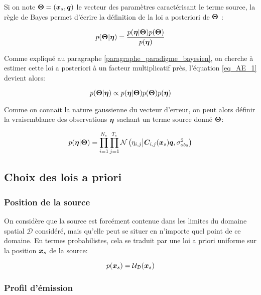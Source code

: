 Si on note ${\bm{\Theta}} = ({\bm{x}_s}, {\bm{q}})$ le vecteur des paramètres caractérisant le terme source, la règle de Bayes permet d'écrire la définition de la loi a posteriori de ${\bm{\Theta}}$ : 

\begin{equation}
p({\bm{\Theta}} | {\bm{\eta}}) = \dfrac{p({\bm{\eta}} | {\bm{\Theta}})p({\bm{\Theta}})}{p({\bm{\eta}})}
\label{eq_AE_1}
\end{equation}

Comme expliqué au paragraphe \ref{paragraphe_paradigme_bayesien}, on cherche à estimer cette loi a posteriori à un facteur multiplicatif près, l'équation \eqref{eq_AE_1} devient alors:

\begin{equation}
p({\bm{\Theta}} | {\bm{\eta}}) \propto p({\bm{\eta}} | {\bm{\Theta}})p({\bm{\Theta}})p({\bm{\eta}})
\label{eq_AE_1_prop}
\end{equation}

Comme on connait la nature gaussienne du vecteur d'erreur, on peut alors définir la vraisemblance des observations ${\bm{\eta}}$ sachant un terme source donné ${\bm{\Theta}}$:

\begin{equation}
p({\bm{\eta}} | {\bm{\Theta}}) = \prod\limits_{i=1}^{N_c} \prod\limits_{j=1}^{T_c}\mathcal{N}\left({\eta}_{i,j} \middle\vert {\bm{C}}_{i,j}({\bm{x}_s}){\bm{q}}, {\sigma_{obs}^2}\right)
\label{eq_AE_5}
\end{equation}

\subsection{Choix des lois a priori}

\subsubsection{Position de la source}

On considère que la source est forcément contenue dans les limites du domaine spatial $\mathcal{D}$ considéré, mais qu'elle peut se situer en n'importe quel point de ce domaine. En termes probabilistes, cela se traduit par une loi a priori uniforme sur la position ${\bm{x}_s}$ de la source:

\begin{equation}
p({\bm{x}_s}) = \mathcal{U}_\mathcal{D}({\bm{x}_s})
\label{eq_AE_7}
\end{equation}


\subsubsection{Profil d'émission}

